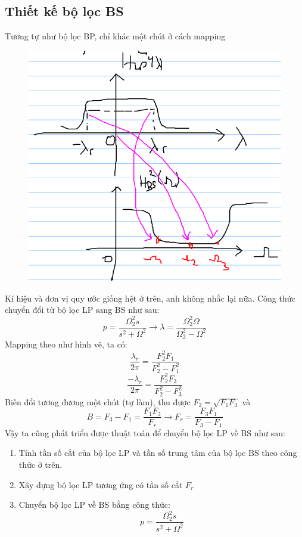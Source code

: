 \documentclass{article}
\begin{document}
\subsection{Thiết kế bộ lọc BS}
Tương tự như bộ lọc BP, chỉ khác một chút ở cách mapping
\begin{figure}[H]
  \begin{center}
  \includegraphics[width=16cm]{12.png}
  \end{center}
  \end{figure}
Kí hiệu và đơn vị quy ước giống hệt ở trên, anh không nhắc lại nữa. Công thức chuyển đổi từ bộ lọc LP sang BS như sau:
$$p=\frac{\Omega_{2}^2s}{s^2+\Omega^2}\rightarrow \lambda=\frac{\Omega_{2}^2\Omega}{\Omega_{2}^2-\Omega^2}$$
Mapping theo như hình vẽ, ta có: $$\frac{\lambda_{r}}{2\pi}=\frac{F_{2}^2F_{1}}{F_{2}^2-F_{1}^2}$$
$$\frac{-\lambda_{r}}{2\pi}=\frac{F_{2}^2F_{3}}{F_{2}^2-F_{3}^2}$$
Biến đổi tương đương một chút (tự làm), thu được $F_{2}=\sqrt{F_{1}F_{3}}$ và $$B=F_{3}-F_{1}=\frac{F_{1}F_{3}}{F_{r}}\rightarrow F_{r}=\frac{F_{3}F_{1}}{F_{3}-F_{1}}$$
Vậy ta cũng phát triển được thuật toán để chuyển bộ lọc LP về BS như sau:
\begin{enumerate}
    \item Tính tần số cắt của bộ lọc LP và tần số trung tâm của bộ lọc BS theo công thức ở trên.
    \item Xây dựng bộ lọc LP tương ứng có tần số cắt $F_{r}$
    \item Chuyển bộ lọc LP về BS bằng công thức:
    $$p=\frac{\Omega_{2}^2s}{s^2+\Omega^2}$$
\end{enumerate}
\end{document}
